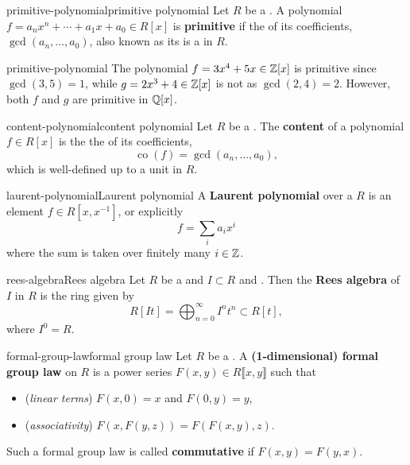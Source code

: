 \begin{topic}{primitive-polynomial}{primitive polynomial}
    Let $R$ be a . A polynomial $f = a_n x^n + \cdots + a_1 x + a_0 \in R[x]$ is \textbf{primitive} if the  of its coefficients, $\gcd(a_n, \ldots, a_0)$, also known as its  is a  in $R$.
\end{topic}

\begin{example}{primitive-polynomial}
    The polynomial $f = 3x^4 + 5x \in \mathbb{Z}[x]$ is primitive since $\gcd(3, 5) = 1$, while $g = 2x^3 + 4 \in \mathbb{Z}[x]$ is not as $\gcd(2, 4) = 2$. However, both $f$ and $g$ are primitive in $\mathbb{Q}[x]$.
\end{example}

\begin{topic}{content-polynomial}{content polynomial}
    Let $R$ be a . The \textbf{content} of a polynomial $f \in R[x]$ is the the  of its coefficients,
    \[ \operatorname{co}(f) = \gcd(a_n, \ldots, a_0) , \]
    which is well-defined up to a unit in $R$.
\end{topic}

\begin{topic}{laurent-polynomial}{Laurent polynomial}
    A \textbf{Laurent polynomial} over a  $R$ is an element $f \in R[x, x^{-1}]$, or explicitly
    \[ f = \sum_{i} a_i x^i \]
    where the sum is taken over finitely many $i \in \mathbb{Z}$.
\end{topic}

\begin{topic}{rees-algebra}{Rees algebra}
    Let $R$ be a  and $I \subset R$ and . Then the \textbf{Rees algebra} of $I$ in $R$ is the ring given by
    \[ R[It] = \bigoplus_{n = 0}^\infty I^n t^n \subset R[t] , \]
    where $I^0 = R$. %
\end{topic}

\begin{topic}{formal-group-law}{formal group law}
    Let $R$ be a . A \textbf{(1-dimensional) formal group law} on $R$ is a power series $F(x, y) \in R\llbracket x, y \rrbracket$ such that
    \begin{itemize}
        \item (\textit{linear terms}) $F(x, 0) = x$ and $F(0, y) = y$,
        \item (\textit{associativity}) $F(x, F(y, z)) = F(F(x, y), z)$.
    \end{itemize}
    Such a formal group law is called \textbf{commutative} if $F(x, y) = F(y, x)$.
\end{topic}

